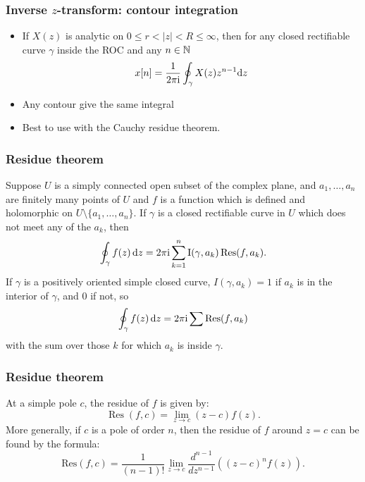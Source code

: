 \begin{frame}
\frametitle{Inverse $z$-transform: contour integration}
\begin{itemize}
\item If $X(z)$ is analytic on $0 \leq r < |z| < R \leq \infty$, then for any   closed rectifiable curve $\gamma$ inside the ROC and any $n \in \mathbb{N}$
\[
x[n]= \frac{1}{2 \pi \mathrm{i}} \oint_{\gamma} X(z) z^{n-1} \mathrm{d} z
\]
\item  \alert{Any contour give the same integral}
\item Best to use with the Cauchy residue theorem.
\end{itemize}
\end{frame}


\begin{frame}
\frametitle{Residue theorem}
Suppose $U$ is a simply connected open subset of the complex plane, and $a_1,\dots,a_n$ are finitely many points of $U$ and $f$ is a function which is defined and holomorphic on $U \setminus \{a_1,\dots,a_n\}$. If $\gamma$ is a closed rectifiable curve in $U$ which does not meet any of the $a_k$,
then
\[
\oint_\gamma f(z)\, \mathrm{d} z =
2\pi \mathrm{i} \sum_{k=1}^n \operatorname{I}(\gamma, a_k) \operatorname{Res}( f, a_k ).
\]
If $\gamma$ is a positively oriented simple closed curve, $I(\gamma, a_k) = 1$ if $a_k$ is in the interior of $\gamma$, and $0$ if not, so
\[
\oint_\gamma f(z)\, \mathrm{d} z =
2 \pi \mathrm{i} \sum \operatorname{Res}( f, a_k )
\]
with the sum over those $k$ for which $a_k$ is inside $\gamma$.
\end{frame}

\begin{frame}
\frametitle{Residue theorem}
At a simple pole $c$, the residue of $f$ is given by:
$$
\operatorname{Res}(f,c)=\lim_{z\to c}(z-c)f(z).
$$
More generally, if $c$ is a pole of order $n$, then the residue of $f$ around $z = c$ can be found by the formula:
$$
 \mathrm{Res}(f,c) = \frac{1}{(n-1)!} \lim_{z \to c} \frac{d^{n-1}}{dz^{n-1}}\left( (z-c)^{n}f(z) \right).
$$ 
\end{frame}





